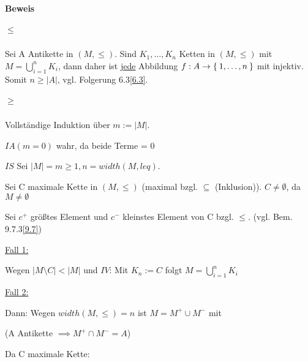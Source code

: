 \documentclass{../../meta/tudscript}
\begin{document}
 \setcounter{section}{14}
    \setcounter{subsection}{8}
    
    \paragraph{Beweis}

    \subparagraph{$\leq$}

    Sei A Antikette in $(M, \leq)$. Sind $K_1, \ldots, K_n$ Ketten in $(M, \leq)$
    mit $M = \bigcup_{i = 1}^{n} K_i$, dann
    daher ist \underline{jede} Abbildung $f: A \rightarrow \Set{1, \ldots, n}$ mit 
    injektiv. Somit $n \geq |A|$, vgl. Folgerung 6.3\ref{6.3}.
    

    \subparagraph{$\geq$}
    
    Vollständige Induktion über $m := |M|$.

    $\boxed{IA} (m = 0)$ wahr, da beide Terme = 0

    $\boxed{IS}$ Sei $|M| = m \geq 1, n = width (M, leq)$.

    Sei C maximale Kette in $(M, \leq)$ (maximal bzgl. $\subseteq$ (Inklusion)).
    $C \neq \emptyset$, da $M \neq \emptyset$

    Sei $c^+$ größtes Element und $c^-$ kleinstes Element von C bzgl. $\leq$.
    (vgl. Bem. 9.7.3\ref{9.7})

    \underline{Fall 1:}

    Wegen $|M \setminus C| < |M|$ und $\boxed{IV}$:
    Mit $K_n := C$ folgt $M = \bigcup_{i = 1}^n K_i$

    \underline{Fall 2:}

    Dann:
    Wegen $width (M, \leq) = n$ ist $M = M^+ \cup M^-$ mit 
    
    (A Antikette $\implies M^+ \cap M^- = A$)
    
    Da C maximale Kette:
    
\end{document}
